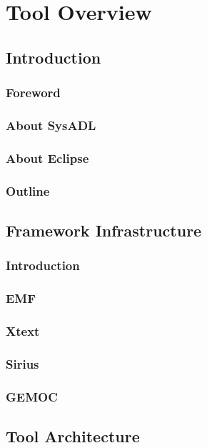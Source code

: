 \chapter{Tool Overview}

\section{Introduction}
\subsection{Foreword}
\subsection{About SysADL}
\subsection{About Eclipse}
\subsection{Outline}
\section{\label{to:fi}Framework Infrastructure}
\subsection{\label{to:fi:intro}Introduction}
\subsection{\label{to:fi:emf}EMF}
\subsection{\label{to:fi:xtext}Xtext}
\subsection{\label{to:fi:sirius}Sirius}
\subsection{\label{to:fi:gemoc}GEMOC}
\section{\label{to:arch}Tool Architecture}